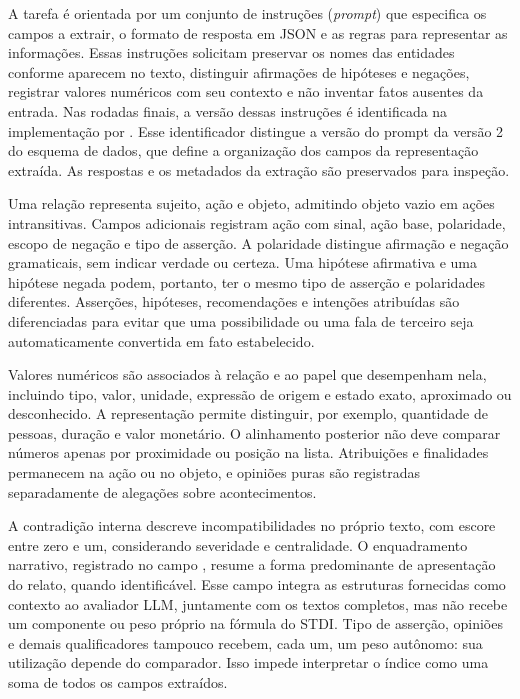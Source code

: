 A tarefa é orientada por um conjunto de instruções (\textit{prompt}) que especifica os campos a extrair, o formato de resposta em JSON e as regras para representar as informações. Essas instruções solicitam preservar os nomes das entidades conforme aparecem no texto, distinguir afirmações de hipóteses e negações, registrar valores numéricos com seu contexto e não inventar fatos ausentes da entrada. Nas rodadas finais, a versão dessas instruções é identificada na implementação por . Esse identificador distingue a versão do prompt da versão 2 do esquema de dados, que define a organização dos campos da representação extraída. As respostas e os metadados da extração são preservados para inspeção.

Uma relação representa sujeito, ação e objeto, admitindo objeto vazio em ações intransitivas. Campos adicionais registram ação com sinal, ação base, polaridade, escopo de negação e tipo de asserção. A polaridade distingue afirmação e negação gramaticais, sem indicar verdade ou certeza. Uma hipótese afirmativa e uma hipótese negada podem, portanto, ter o mesmo tipo de asserção e polaridades diferentes. Asserções, hipóteses, recomendações e intenções atribuídas são diferenciadas para evitar que uma possibilidade ou uma fala de terceiro seja automaticamente convertida em fato estabelecido.

Valores numéricos são associados à relação e ao papel que desempenham nela, incluindo tipo, valor, unidade, expressão de origem e estado exato, aproximado ou desconhecido. A representação permite distinguir, por exemplo, quantidade de pessoas, duração e valor monetário. O alinhamento posterior não deve comparar números apenas por proximidade ou posição na lista. Atribuições e finalidades permanecem na ação ou no objeto, e opiniões puras são registradas separadamente de alegações sobre acontecimentos.

A contradição interna descreve incompatibilidades no próprio texto, com escore entre zero e um, considerando severidade e centralidade. O enquadramento narrativo, registrado no campo , resume a forma predominante de apresentação do relato, quando identificável. Esse campo integra as estruturas fornecidas como contexto ao avaliador LLM, juntamente com os textos completos, mas não recebe um componente ou peso próprio na fórmula do STDI. Tipo de asserção, opiniões e demais qualificadores tampouco recebem, cada um, um peso autônomo: sua utilização depende do comparador. Isso impede interpretar o índice como uma soma de todos os campos extraídos.


